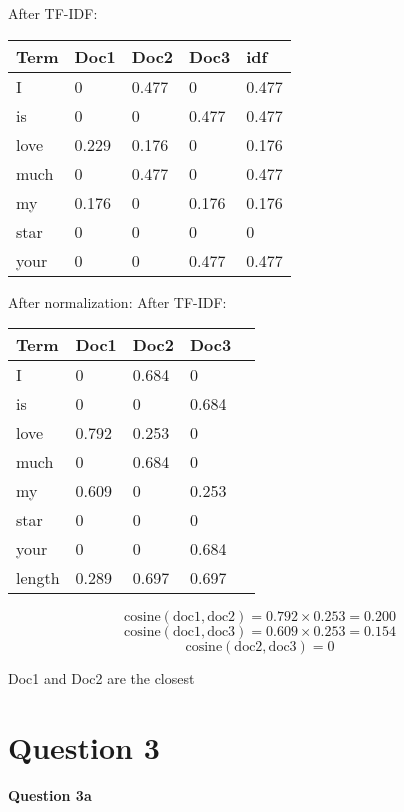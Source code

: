 \documentclass[11pt,a4paper]{report}
\begin{document}
\begin{multicols*}{2}
\noindent After TF-IDF:
\begin{center}
\begin{tabular}{ | l | l l l |l|}
    \hline
    Term   & Doc1 & Doc2 & Doc3 & idf   \\
    \hline
    I      &0     &0.477 &0     & 0.477 \\
    is     &0     &0     &0.477 & 0.477 \\
    love   &0.229 &0.176 &0     & 0.176 \\
    much   &0     &0.477 &0     & 0.477 \\
    my     &0.176 &0     &0.176 & 0.176 \\
    star   &0     &0     &0     & 0     \\
    your   &0     &0     &0.477 & 0.477 \\
    \hline
\end{tabular}
\end{center}

\noindent After normalization:
\noindent After TF-IDF:
\begin{center}
\begin{tabular}{ | l | l l l |l|}
    \hline
    Term   & Doc1 & Doc2 & Doc3 \\
    \hline
    I      &0     &0.684 &0     \\
    is     &0     &0     &0.684 \\
    love   &0.792 &0.253 &0     \\
    much   &0     &0.684 &0     \\
    my     &0.609 &0     &0.253 \\
    star   &0     &0     &0     \\
    your   &0     &0     &0.684 \\
    \hline
    length &0.289 &0.697 &0.697 \\
    \hline
\end{tabular}
\end{center}

$$\text{cosine}(\text{doc1},\text{doc2})=0.792 \times 0.253 = 0.200$$
$$\text{cosine}(\text{doc1},\text{doc3})=0.609 \times 0.253 = 0.154$$
$$\text{cosine}(\text{doc2},\text{doc3})=0$$

\noindent Doc1 and Doc2 are the closest

\section{Question 3}

\noindent \textbf{Question 3a}


\end{multicols*}
\end{document}
